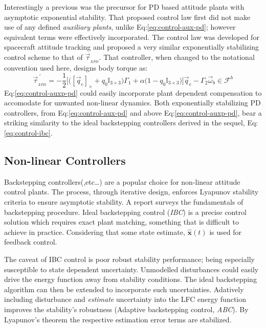 {\newpage
Interestingly a previous \cite{robustattitude} was the precursor for PD based attitude plants with asymptotic exponential stability. That proposed control law first did not make use of any defined \emph{auxiliary plants}, unlike Eq:\ref{eq:control-aux-pd}; however equivalent terms were effectively incorporated. The control law was developed for spacecraft attitude tracking and proposed a very similar exponentially stabilizing control scheme to that of $\vec{\tau}_{_{XPD}}$. That controller, when changed to the notational convention used here, designs body torque as:
\begin{equation}\label{eq:control-auxp-pd}
\vec{\tau}^{\hspace{3pt}'}_{_{XPD}}=-\frac{1}{2}\Big[\big([\vec{q}_e]_\times+q_0\mathbb{I}_{3\times 3}\big)\Gamma_1+\alpha\big(1-q_0\mathbb{I}_{3\times 3}\big)\Big]\vec{q}_e-\Gamma_2\vec{\omega}_b\in\mathcal{F}^b
\end{equation} 
Eq:\ref{eq:control-auxp-pd} could easily incorporate plant dependent compensation to accomodate for unwanted non-linear dynamics. Both exponentially stabilizing PD controllers, from Eq:\ref{eq:control-aux-pd} and above Eq:\ref{eq:control-auxp-pd}, bear a striking similarity to the ideal backstepping controllers derived in the sequel, Eq:\ref{eq:control-ibc}. 
\subsection{Non-linear Controllers}
\label{subsec:control.attitude.nonlinear}
Backstepping controllers(\cite{satellitebackstepping,intelligentbackstep,backstepslidingmode},etc\ldots) are a popular choice for non-linear attitude control plants. The process, through iterative design, enforces Lyapunov stability criteria to ensure asymptotic stability. A report \cite{backstepping} surveys the fundamentals of backstepping procedure. Ideal backstepping control (\emph{IBC}) is a precise control solution which requires exact plant matching, something that is difficult to achieve in practice. Considering that some state estimate, $\hat{\mathbf{x}}(t)$ is used for feedback control. 
\par
The caveat of IBC control is poor robust stability performance; being especially susceptible to state dependent uncertainty. Unmodelled disturbances could easily drive the energy function away from stability conditions. The ideal backstepping algorithm can then be extended to incorporate such uncertainties. Adatively including disturbance and \emph{estimate} uncertainty into the LFC energy function improves the stability's robustness (Adaptive backstepping control, \emph{ABC}). By Lyapunov's theorem the respective estimation error terms are stabilized.
}
